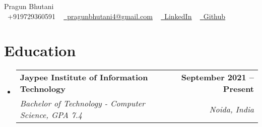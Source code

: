 \documentclass[letterpaper,11pt]{article}
\makeatletter
\newcommand{\resumeSubheading}[4]{
  \vspace{-2pt}\item
    \begin{tabular*}{1.0\textwidth}[t]{l@{\extracolsep{\fill}}r}
      \textbf{#1} & \textbf{\small #2} \\
      \textit{\small#3} & \textit{\small #4} \\
    \end{tabular*}\vspace{-7pt}
}
\newcommand{\resumeSubHeadingListStart}{\begin{itemize}[leftmargin=0.0in, label={}]}
\newcommand{\resumeSubHeadingListEnd}{\end{itemize}}
\makeatother
\begin{document}
\begin{center}
    {\Huge \textsc{P}ragun \textsc{B}hutani} \\ \vspace{1pt}
    \small \raisebox{-0.1\height}\faPhone\ +919729360591 ~ 
    \href{mailto:pragunbhutani4@gmail.com}{\raisebox{-0.2\height}\faEnvelope\ \underline{pragunbhutani4@gmail.com}} ~ 
    \href{https://www.linkedin.com/in/pragun-bhutani-1194b9221/}{\raisebox{-0.2\height}\faLinkedin\ \underline{LinkedIn}} ~ 
    \href{https://github.com/pragunb02}{\raisebox{-0.2\height}\faGithub\ \underline{Github}} ~

    \vspace{-8pt}
\end{center}


\section{Education}
  \resumeSubHeadingListStart
  \resumeSubheading
  {Jaypee Institute of Information Technology}{September 2021 -- Present}
  {Bachelor of Technology - Computer Science, GPA 7.4}{Noida, India}
  \resumeSubHeadingListEnd
\vspace{-5pt}



\end{document}
